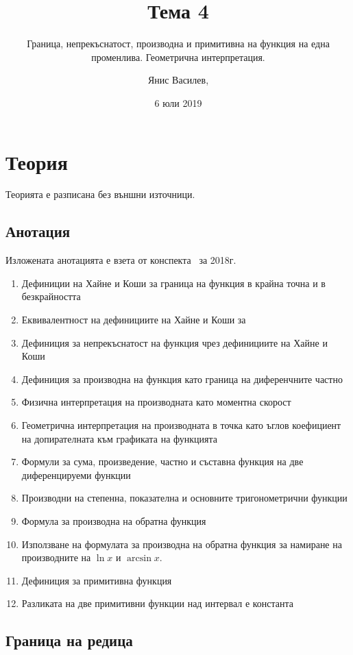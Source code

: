 \documentclass[numbers=endperiod, DIV=15, bibliography=totocnumbered]{scrartcl}
\title{Тема 4}
\subtitle{Граница, непрекъснатост, производна и примитивна на функция на една променлива. Геометрична интерпретация.}
\author{Янис Василев, \Email{ianis@ivasilev.net}}
\date{6 юли 2019}
\begin{document}
\maketitle

\section{Теория}

Теорията е разписана без външни източници.

\subsection{Анотация}

Изложената анотацията е взета от конспекта~\cite{Syllabus} за 2018г.

\begin{enumerate}
  \item Дефиниции на Хайне и Коши за граница на функция в крайна точна и в безкрайността
  \item Еквивалентност на дефинициите на Хайне и Коши за
  \item Дефиниция за непрекъснатост на функция чрез дефинициите на Хайне и Коши
  \item Дефиниция за производна на функция като граница на диференчните частно
  \item Физична интерпретация на производната като моментна скорост
  \item Геометрична интерпретация на производната в точка като ъглов коефициент на допирателната към графиката на функцията
  \item Формули за сума, произведение, частно и съставна функция на две диференцируеми функции
  \item Производни на степенна, показателна и основните тригонометрични функции
  \item Формула за производна на обратна функция
  \item Използване на формулата за производна на обратна функция за намиране на производните на $\ln x$ и $\arcsin x$.
  \item Дефиниция за примитивна функция
  \item Разликата на две примитивни функции над интервал е константа
\end{enumerate}

\subsection{Граница на редица}
\end{document}
